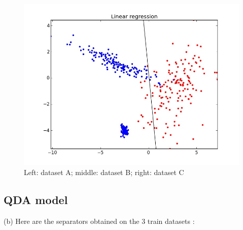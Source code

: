\documentclass[11pt,a4paper]{article}
\begin{document}
\begin{figure}[H]
\noindent\includegraphics[scale=0.2]{images/linear_C.jpeg}
\caption{Left: dataset A; middle: dataset B; right: dataset C}
\end{figure}

\subsection{QDA model}


(b) Here are the separators obtained on the 3 train datasets : 
\end{document}
